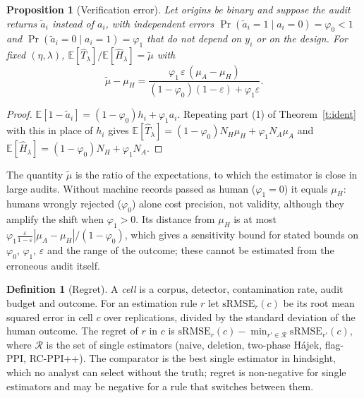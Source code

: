 \documentclass[11pt]{article}
\newtheorem{proposition}{Proposition}
\theoremstyle{definition}
\newtheorem{definition}{Definition}
\newcommand{\E}{\mathbb{E}}
\newcommand{\muH}{\mu_H}
\begin{document}
\begin{proposition}[Verification error]\label{p:flip}
Let origins be binary and suppose the audit returns $\tilde a_i$ instead of $a_i$, with
independent errors $\Pr(\tilde a_i=1\mid a_i=0)=\varphi_0<1$ and
$\Pr(\tilde a_i=0\mid a_i=1)=\varphi_1$ that do not depend on $y_i$ or on the design. For
fixed $(\eta,\lambda)$, $\E[\hat T_\lambda]/\E[\hat H_\lambda]=\tilde\mu$ with
\begin{equation}\label{eq:flip}
\tilde\mu-\muH=\frac{\varphi_1\,\varepsilon\,(\mu_A-\muH)}{(1-\varphi_0)(1-\varepsilon)+\varphi_1\varepsilon}.
\end{equation}
\end{proposition}
\begin{proof}
$\E[1-\tilde a_i]=(1-\varphi_0)h_i+\varphi_1a_i$. Repeating part (1) of
Theorem~\ref{t:ident} with this in place of $h_i$ gives
$\E[\hat T_\lambda]=(1-\varphi_0)N_H\muH+\varphi_1N_A\mu_A$ and
$\E[\hat H_\lambda]=(1-\varphi_0)N_H+\varphi_1N_A$.
\end{proof}
The quantity $\tilde\mu$ is the ratio of the expectations, to which the estimator is close
in large audits. Without machine records passed as human ($\varphi_1=0$) it equals $\muH$: humans wrongly
rejected ($\varphi_0$) alone cost precision, not validity, although they amplify the
shift when $\varphi_1>0$. Its distance from $\muH$ is at most
$\varphi_1\frac{\varepsilon}{1-\varepsilon}|\mu_A-\muH|/(1-\varphi_0)$, which gives a
sensitivity bound for stated bounds on $\varphi_0$, $\varphi_1$, $\varepsilon$ and the
range of the outcome; these cannot be estimated from the erroneous audit itself.

\begin{definition}[Regret]\label{d:regret}
A \emph{cell} is a corpus, detector, contamination rate, audit budget and outcome. For an
estimation rule $r$ let $\mathrm{sRMSE}_r(c)$ be its root mean squared error in cell $c$
over replications, divided by the standard deviation of the human outcome. The regret of
$r$ in $c$ is $\mathrm{sRMSE}_r(c)-\min_{r'\in\mathcal R}\mathrm{sRMSE}_{r'}(c)$, where
$\mathcal R$ is the set of single estimators (naive, deletion, two-phase H\'ajek, flag-PPI,
RC-PPI++). The comparator is the best single estimator in hindsight, which no analyst can
select without the truth; regret is non-negative for single estimators and may be negative
for a rule that switches between them.
\end{definition}
\end{document}
